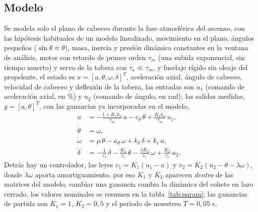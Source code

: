 \documentclass[article, 11pt]{IEEEtran}   %
\begin{document}
\subsection*{Modelo}
Se modela solo el plano de cabeceo durante la fase atmosf\'erica del ascenso, con las hip\'otesis habituales de un modelo linealizado, movimiento en el plano, \'angulos peque\~nos ($\sin\theta\approx\theta$), masa, inercia y presi\'on din\'amica constantes en la ventana de an\'alisis, motor con retardo de primer orden $\tau_m$ (una subida exponencial, sin tiempo muerto) y servo de la tobera con $\tau_s\ll\tau_m$, y fuselaje r\'igido sin oleaje del propelente, el estado es $x=[a,\theta,\omega,\delta]^T$, aceleraci\'on axial, \'angulo de cabeceo, velocidad de cabeceo y deflexi\'on de la tobera, las entradas son $u_1$ (comando de aceleraci\'on axial, en \%) y $u_2$ (comando de \'angulo, en rad); las salidas medidas, $y=[a,\theta]^T$, con las ganancias ya incorporadas en el modelo,
\begin{align}
\dot a &= -\tfrac{1+K_1k_a}{\tau_m}\,a-c_\theta\,\theta+\tfrac{K_1k_a}{\tau_m}\,u_1,\label{eq:a}\\
\dot\theta &= \omega,\label{eq:th}\\
\dot\omega &= \mu\,\theta-a_d\,\omega+k_\delta\,\delta+k_\varepsilon\,a,\label{eq:om}\\
\dot\delta &= -\tfrac{1}{\tau_s}\,\delta-\tfrac{K_2}{\tau_s}\,\theta-\tfrac{\lambda K_2}{\tau_s}\,\omega+\tfrac{K_2}{\tau_s}\,u_2.\label{eq:de}
\end{align}
Detr\'as hay un controlador, las leyes $v_1=K_1(u_1-a)$ y $v_2=K_2(u_2-\theta-\lambda\omega)$, donde $\lambda\omega$ aporta amortiguamiento, por eso $K_1$ y $K_2$ aparecen \emph{dentro} de las matrices del modelo, cambiar una ganancia cambia la din\'amica del cohete en lazo cerrado, los valores nominales se resumen en la tabla~\ref{tab:param}; las ganancias de partida son $K_1=1$, $K_2=0{,}5$ y el periodo de muestreo $T=0{,}05$ s.
\end{document}

